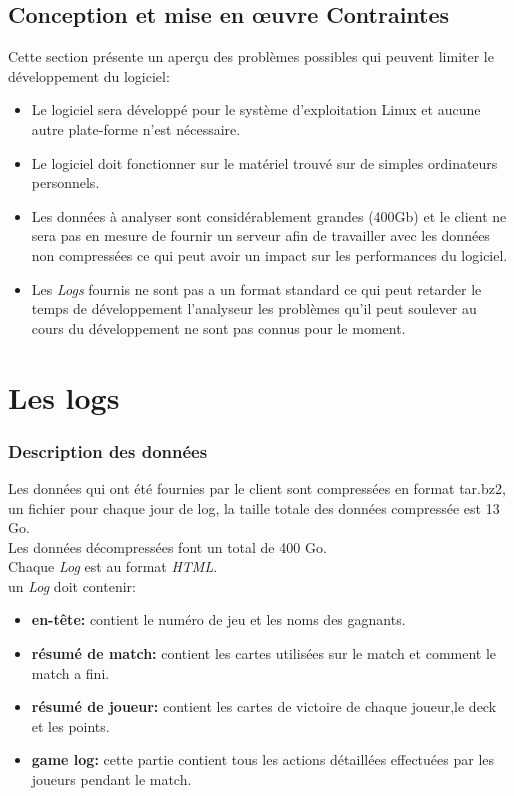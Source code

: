 \documentclass{scrreprt}
\begin{document}
\section{Conception et mise en œuvre Contraintes}
Cette section présente un aperçu des problèmes possibles qui peuvent limiter le développement du logiciel:
\begin{itemize}
\item Le logiciel sera développé pour le système d'exploitation Linux et aucune autre plate-forme n’est nécessaire.
\item Le logiciel doit fonctionner sur le matériel trouvé sur de simples ordinateurs personnels.
\item Les données à analyser sont considérablement grandes (400Gb) et le client ne sera pas en mesure de fournir un serveur afin de travailler avec les données non compressées ce qui peut avoir un impact sur les performances du logiciel.

\item Les \textit{Logs} fournis ne sont pas a un format standard ce qui peut retarder le temps de développement l'analyseur les problèmes qu'il peut soulever au cours du développement ne sont pas connus pour le moment.
\end{itemize}

\chapter{Les logs}
\subsection{Description des données}
Les données qui ont été fournies par le client sont compressées en format tar.bz2, un fichier pour chaque jour de log, la taille totale des données compressée est 13 Go.\\
Les données décompressées font un total de 400 Go.\\
Chaque \textit{Log} est au format \textit{HTML}.\\
un \textit{Log} doit contenir:
\begin{itemize}
  \item{\textbf{en-tête:}} contient le numéro de jeu et les noms des gagnants.
  \item{\textbf{résumé de  match:}} contient les cartes utilisées sur le match et comment le match a fini.
  \item{\textbf{résumé de joueur:}} contient  les cartes de victoire de chaque joueur,le deck et les points.
  \item{\textbf{game log:}} cette partie contient tous les actions détaillées effectuées par les joueurs pendant le match.

\end{itemize}
\end{document}
